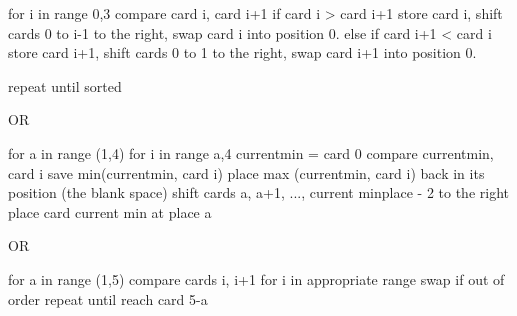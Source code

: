 
for i in range 0,3
    compare card i, card i+1
    if card i > card i+1
        store card i, shift cards 0 to i-1 to the right, swap card i into position 0.
    else if card i+1 < card i
        store card i+1, shift cards 0 to 1 to the right, swap card i+1 into position 0.

repeat until sorted



OR

for a in range (1,4)
    for i in range a,4
        currentmin = card 0
        compare currentmin, card i
        save min(currentmin, card i)
        place max (currentmin, card i) back in its position (the blank space)
    shift cards a, a+1, ..., current minplace - 2 to the right
    place card current min at place a

OR


for a in range (1,5)
    compare cards i, i+1 for i in appropriate range
    swap if out of order
    repeat until reach card 5-a
